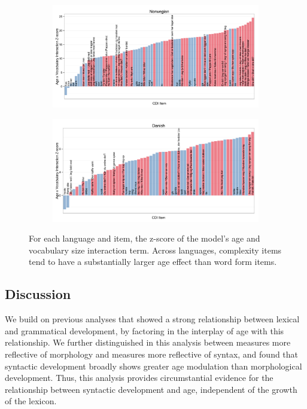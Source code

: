 \documentclass[10pt,letterpaper]{article}
\begin{document}
\begin{figure}[tb]
\begin{subfigure}[b]{0.45\textwidth}
\includegraphics[width=\textwidth]{plots/norwegian_interactions}
\end{subfigure}
\begin{subfigure}[b]{0.45\textwidth}
\includegraphics[width=\textwidth]{plots/danish_interactions}
\end{subfigure}

\caption{\label{fig:interactions} For each language and item, the z-score of the model's age and vocabulary size interaction term. Across languages, complexity items tend to have a substantially larger age effect than word form items.}

\end{figure}

\subsection{Discussion}

We build on previous analyses that showed a strong relationship between lexical and grammatical development, by factoring in the interplay of age with this relationship. We further distinguished in this analysis between measures more reflective of morphology and measures more reflective of syntax, and found that syntactic development broadly shows greater age modulation than morphological development. Thus, this analysis provides circumstantial evidence for the relationship between syntactic development and age, independent of the growth of the lexicon. 
\end{document}
